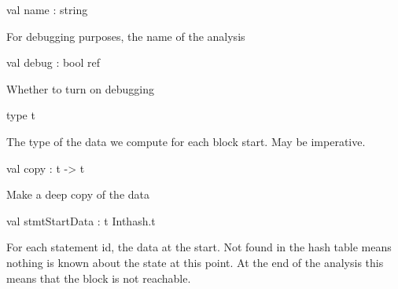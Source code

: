 \documentclass[11pt]{article}
\begin{document}
\begin{ocamldocsigend}


\label{val:Dataflow.ForwardsTransfer.name}\begin{ocamldoccode}
val name : string
\end{ocamldoccode}
\begin{ocamldocdescription}
For debugging purposes, the name of the analysis


\end{ocamldocdescription}


\label{val:Dataflow.ForwardsTransfer.debug}\begin{ocamldoccode}
val debug : bool ref
\end{ocamldoccode}
\begin{ocamldocdescription}
Whether to turn on debugging


\end{ocamldocdescription}


\label{type:Dataflow.ForwardsTransfer.t}\begin{ocamldoccode}
type t 
\end{ocamldoccode}
\begin{ocamldocdescription}
The type of the data we compute for each block start. May be 
 imperative.


\end{ocamldocdescription}


\label{val:Dataflow.ForwardsTransfer.copy}\begin{ocamldoccode}
val copy : t -> t
\end{ocamldoccode}
\begin{ocamldocdescription}
Make a deep copy of the data


\end{ocamldocdescription}


\label{val:Dataflow.ForwardsTransfer.stmtStartData}\begin{ocamldoccode}
val stmtStartData : t Inthash.t
\end{ocamldoccode}
\begin{ocamldocdescription}
For each statement id, the data at the start. Not found in the hash 
 table means nothing is known about the state at this point. At the end 
 of the analysis this means that the block is not reachable.


\end{ocamldocdescription}



\end{ocamldocsigend}
\end{document}

